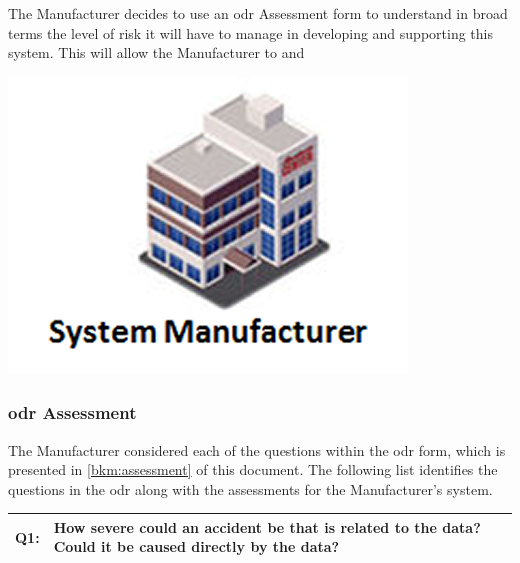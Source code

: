 %
%
\begin{minipage}[t][2cm]{0.73\textwidth}
  The Manufacturer decides to use an \gls{odr} Assessment form to understand in broad terms the level of risk it will have to manage in developing and supporting this system. This will allow the Manufacturer to  and 
\end{minipage}
\begin{minipage}[c][1cm]{0.25\textwidth}
	\vspace{1cm}
  \centering
    \includegraphics[width=\textwidth]{images/manufacturer}
\end{minipage}

\subsubsection{\Gls{odr} Assessment}
The Manufacturer considered each of the questions within the \gls{odr} form, which is presented in \autoref{bkm:assessment} of this document.
The following list identifies the questions in the \gls{odr} along with the assessments for the Manufacturer's system.

\begin{longtable*}[H]
  {|L{}|L{}|}
  \hline
  Q1: & How severe could an accident be that is related to the data? Could it be caused directly by the data?\\
  \hline
\end{longtable*}

